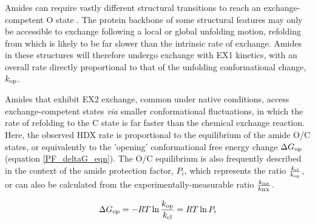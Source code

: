 \documentclass[9pt,tutorial]{livecoms}
\begin{document}
Amides can require vastly different structural transitions to reach an exchange-competent O state \cite{Hvidt1966, Englander1983, Skinner2012mechanisms, Skinner2012models}. 
The protein backbone of some structural features may only be accessible to exchange following a local or global unfolding motion, refolding from which is likely to be far slower than the intrinsic rate of exchange.
Amides in these structures will therefore undergo exchange with EX1 kinetics, with an overall rate directly proportional to that of the unfolding conformational change, $k_\textnormal{op}$.

Amides that exhibit EX2 exchange, common under native conditions, access exchange-competent states \textit{via} smaller conformational fluctuations, in which the rate of refolding to the C state is far faster than the chemical exchange reaction.
Here, the observed HDX rate is proportional to the equilibrium of the amide O/C states, or equivalently to the 'opening' conformational free energy change $\Delta G_{\textnormal{op}}$ (equation \ref{PF_deltaG_eqn}).
The O/C equilibrium is also frequently described in the context of the amide protection factor, $P_i$, which represents the ratio $\frac{k_\textnormal{cl}}{k_\textnormal{op}}$, or can also be calculated from the experimentally-measurable ratio $\frac{k_\textnormal{int}}{k_\textnormal{HX}}$.

\begin{equation}\label{PF_deltaG_eqn}
{\Delta}G_{\textnormal{op}} = -RT\ln{\frac{k_{\textnormal{op}}}{k_{\textnormal{cl}}}} = RT\ln{P_i}
\end{equation}
\end{document}
